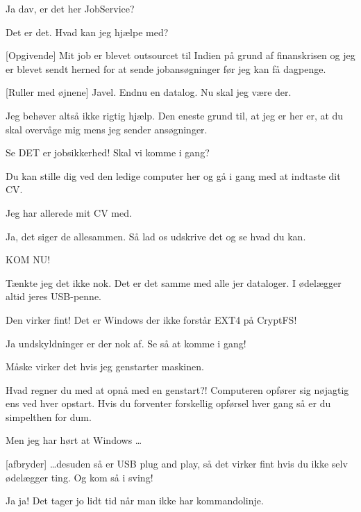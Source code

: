 \documentclass[a4paper,11pt]{article}
\begin{document}
\begin{sketch}


 Ja dav, er det her JobService?

 Det er det. Hvad kan jeg hjælpe med?

[Opgivende] Mit job er blevet outsourcet til Indien på grund af finanskrisen og jeg er blevet sendt herned for at sende jobansøgninger før jeg kan få dagpenge.

[Ruller med øjnene] Javel. Endnu en datalog. Nu skal jeg være der.

 Jeg behøver altså ikke rigtig hjælp. Den eneste grund til, at jeg er her er, at du skal overvåge mig mens jeg sender ansøgninger.

 Se DET er jobsikkerhed! Skal vi komme i gang?

 

 Du kan stille dig ved den ledige computer her og gå i gang med at indtaste dit CV.

 Jeg har allerede mit CV med. 

 Ja, det siger de allesammen. Så lad os udskrive det og se hvad du kan.


 KOM NU!

 Tænkte jeg det ikke nok. Det er det samme med alle jer dataloger. I ødelægger altid jeres USB-penne.

 Den virker fint! Det er Windows der ikke forstår EXT4 på CryptFS!

 Ja undskyldninger er der nok af. Se så at komme i gang!

 Måske virker det hvis jeg genstarter maskinen.

 Hvad regner du med at opnå med en genstart?! Computeren opfører sig nøjagtig ens ved hver opstart. Hvis du forventer forskellig opførsel hver gang så er du simpelthen for dum.

 Men  jeg har hørt at Windows \ldots

[afbryder] \ldots desuden så er USB plug and play, så det virker fint hvis du ikke selv ødelægger ting. Og kom så i sving!

 Ja ja! Det tager jo lidt tid når man ikke har kommandolinje.


\end{sketch}
\end{document}
